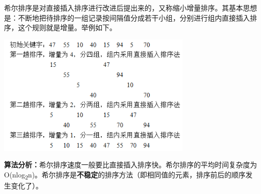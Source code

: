 {希尔排序是{对直接插入排序进行改进后提出来的，又称缩小增量排序}。其基本思想是：不断地把待排序的一组记录按间隔值分成若干小组，分别进行组内直接插入排序，这个规则就是增量。举例如下。}{}

\includegraphics[width=3.70833in,height=2.30208in]{png-jpeg-pics/194B080AB7E87FA66145FF709D9D6B1B.png}

{\textbf{算法分析：}}{希尔排序速度一般要比直接插入排序快。希尔排序的平均时间复杂度为O(nlog}\textsubscript{2}{n)。希尔排序是}\textbf{不稳定}{的排序方法（即相同值的元素，排序前后的顺序发生变化了）。}
